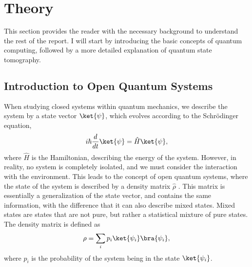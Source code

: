 \documentclass[a4paper,12pt]{article}
\begin{document}
\section{Theory}
This section provides the reader with the necessary background to understand the rest of the report. I will start by introducing the basic concepts of quantum computing, followed by a more detailed explanation of quantum state tomography.
\subsection{Introduction to Open Quantum Systems}
When studying closed systems within quantum mechanics, we describe the system by a state vector $\ket{\psi}$, which evolves according to the Schrödinger equation,
\begin{equation}
    i\hbar \frac{d}{dt} \ket{\psi} = \hat{H} \ket{\psi},
\end{equation}
where $\hat{H}$ is the Hamiltonian, describing the energy of the system. However, in reality, no system is completely isolated, and we must consider the interaction with the environment. This leads to the concept of open quantum systems, where the state of the system is described by a density matrix $\hat{\rho}$ \cite{nielsen_chuang}. This matrix is essentially a generalization of the state vector, and contains the same information, with the difference that it can also describe mixed states. Mixed states are states that are not pure, but rather a statistical mixture of pure states. The density matrix is defined as
\begin{equation}
    \rho = \sum_i p_i \ket{\psi_i} \bra{\psi_i},
\end{equation}
where $p_i$ is the probability of the system being in the state $\ket{\psi_i}$. 
\end{document}
